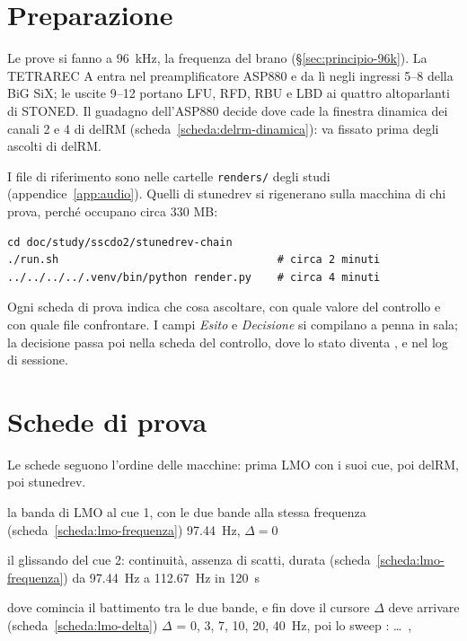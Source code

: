 \chapter{Preparazione}\label{cap:preparazione}
Le prove si fanno a \qty{96}{\kilo\hertz}, la frequenza del brano (\S\ref{sec:principio-96k}).
La TETRAREC A entra nel preamplificatore ASP880 e da lì negli ingressi 5--8 della BiG SiX; le uscite 9--12 portano LFU, RFD, RBU e LBD ai quattro altoparlanti di STONED.
Il guadagno dell'ASP880 decide dove cade la finestra dinamica dei canali 2 e 4 di delRM (scheda~\ref{scheda:delrm-dinamica}): va fissato prima degli ascolti di delRM.

I file di riferimento sono nelle cartelle \texttt{renders/} degli studi (appendice~\ref{app:audio}).
Quelli di stunedrev si rigenerano sulla macchina di chi prova, perché occupano circa 330 MB:

\begin{lstlisting}[language={}]
cd doc/study/sscdo2/stunedrev-chain
./run.sh                                  # circa 2 minuti
../../../../.venv/bin/python render.py    # circa 4 minuti
\end{lstlisting}

Ogni scheda di prova indica che cosa ascoltare, con quale valore del controllo e con quale file confrontare.
I campi \emph{Esito} e \emph{Decisione} si compilano a penna in sala; la decisione passa poi nella scheda del controllo, dove lo stato diventa \deciso, e nel log di sessione.

\chapter{Schede di prova}\label{cap:schede-prova}
Le schede seguono l'ordine delle macchine: prima LMO con i suoi cue, poi delRM, poi stunedrev.

{la banda di LMO al cue 1, con le due bande alla stessa frequenza (scheda~\ref{scheda:lmo-frequenza})}
{\qty{97.44}{\hertz}, $\Delta = 0$}
{}

{il glissando del cue 2: continuità, assenza di scatti, durata (scheda~\ref{scheda:lmo-frequenza})}
{da \qty{97.44}{\hertz} a \qty{112.67}{\hertz} in \qty{120}{\second}}
{}

{dove comincia il battimento tra le due bande, e fin dove il cursore $\Delta$ deve arrivare (scheda~\ref{scheda:lmo-delta})}
{$\Delta$ = 0, 3, 7, 10, 20, \qty{40}{\hertz}, poi lo sweep}
{:  \ldots\ , }

